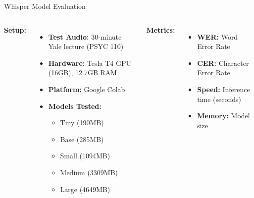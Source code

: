 \documentclass{beamer}
\begin{document}
\begin{frame}{Whisper Model Evaluation}
    \begin{columns}
        \textbf{Setup:}
        \begin{itemize}
            \item \textbf{Test Audio:} 30-minute Yale lecture (PSYC 110)
            \item \textbf{Hardware:} Tesla T4 GPU (16GB), 12.7GB RAM
            \item \textbf{Platform:} Google Colab
            \item \textbf{Models Tested:}
                \begin{itemize}
                    \item Tiny (190MB)
                    \item Base (285MB)
                    \item Small (1094MB)
                    \item Medium (3309MB)
                    \item Large (4649MB)
                \end{itemize}
        \end{itemize}
        
        \textbf{Metrics:}
        \begin{itemize}
            \item \textbf{WER:} Word Error Rate
            \item \textbf{CER:} Character Error Rate
            \item \textbf{Speed:} Inference time (seconds)
            \item \textbf{Memory:} Model size
        \end{itemize}
    \end{columns}
\end{frame}
\end{document}
